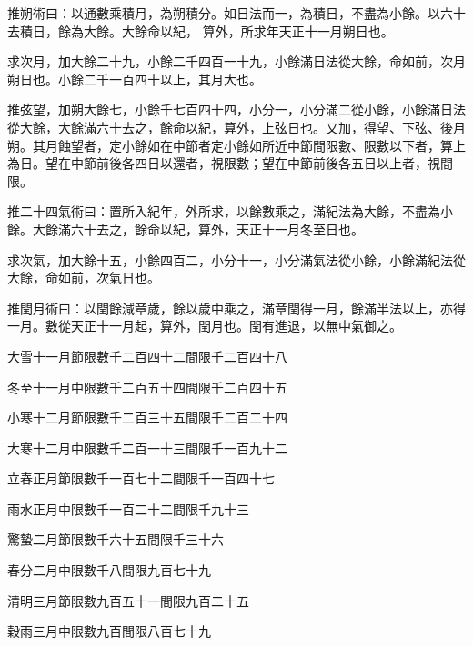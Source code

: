 \begin{pinyinscope}
 推朔術曰：以通數乘積月，為朔積分。如日法而一，為積日，不盡為小餘。以六十去積日，餘為大餘。大餘命以紀，
 算外，所求年天正十一月朔日也。



 求次月，加大餘二十九，小餘二千四百一十九，小餘滿日法從大餘，命如前，次月朔日也。小餘二千一百四十以上，其月大也。



 推弦望，加朔大餘七，小餘千七百四十四，小分一，小分滿二從小餘，小餘滿日法從大餘，大餘滿六十去之，餘命以紀，算外，上弦日也。又加，得望、下弦、後月朔。其月蝕望者，定小餘如在中節者定小餘如所近中節間限數、限數以下者，算上為日。望在中節前後各四日以還者，視限數；望在中節前後各五日以上者，視間限。



 推二十四氣術曰：置所入紀年，外所求，以餘數乘之，滿紀法為大餘，不盡為小餘。大餘滿六十去之，餘命以紀，算外，天正十一月冬至日也。



 求次氣，加大餘十五，小餘四百二，小分十一，小分滿氣法從小餘，小餘滿紀法從大餘，命如前，次氣日也。



 推閏月術曰：以閏餘減章歲，餘以歲中乘之，滿章閏得一月，餘滿半法以上，亦得一月。數從天正十一月起，算外，閏月也。閏有進退，以無中氣御之。



 大雪十一月節限數千二百四十二間限千二百四十八



 冬至十一月中限數千二百五十四間限千二百四十五



 小寒十二月節限數千二百三十五間限千二百二十四



 大寒十二月中限數千二百一十三間限千一百九十二



 立春正月節限數千一百七十二間限千一百四十七



 雨水正月中限數千一百二十二間限千九十三



 驚蟄二月節限數千六十五間限千三十六



 春分二月中限數千八間限九百七十九



 清明三月節限數九百五十一間限九百二十五



 穀雨三月中限數九百間限八百七十九




\end{pinyinscope}
